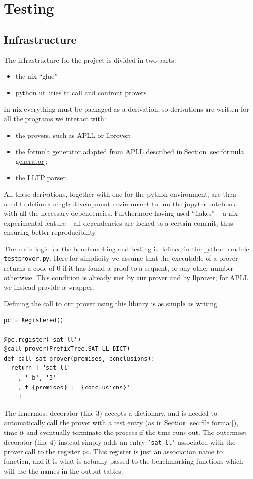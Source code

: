 \chapter{Testing}
\section{Infrastructure}
The infrastructure for the project is divided in two parts:
\begin{itemize}
	\item the nix ``glue''		%
	\item python utilities to call and confront provers
\end{itemize}
In nix everything must be packaged as a derivation, so derivations are written for all the programs we interact with:
\begin{itemize}
	\item the provers, such as APLL or llprover;
	\item the formula generator adapted from APLL described in Section \ref{sec:formula generator};
	\item the LLTP parser.
\end{itemize}
All these derivations, together with one for the python environment, are then used to define a single development environment to run the jupyter notebook with all the necessary dependencies.
Furthermore having used ``flakes'' -- a nix experimental feature -- all dependencies are locked to a certain commit, thus ensuring better reproducibility.

The main logic for the benchmarking and testing is defined in the python module \texttt{testprover.py}.
Here for simplicity we assume that the executable of a prover returns a code of 0 if it has found a proof to a sequent, or any other number otherwise.
This condition is already met by our prover and by llprover; for APLL we instead provide a wrapper.

Defining the call to our prover using this library is as simple as writing
\begin{verbatim}
pc = Registered()

@pc.register('sat-ll')
@call_prover(PrefixTree.SAT_LL_DICT)
def call_sat_prover(premises, conclusions):
  return [ 'sat-ll'
    , '-b', '3'
    , f'{premises} |- {conclusions}'
    ]
\end{verbatim}
The innermost decorator (line 3) accepts a dictionary, and is needed to automatically call the prover with a test entry (as in Section \ref{sec:file format}), time it and eventually terminate the process if the time runs out.
The outermost decorator (line 4) instead simply adds an entry \texttt{'sat-ll'} associated with the prover call to the register \texttt{pc}.
This register is just an association name to function, and it is what is actually passed to the benchmarking functions which will use the names in the output tables.

